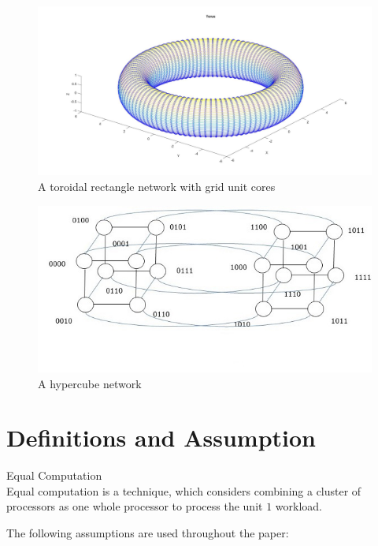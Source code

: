 \begin{figure}[!ht]
\centering
\includegraphics[width=1\columnwidth]{figure/torusnetwork.jpg}
\caption{A toroidal rectangle network with grid unit cores}
\label{fig:torusnetwork}
\end{figure}

\begin{figure}[!ht]
\centering
\includegraphics[width=0.8\columnwidth]{figure/hypercube.jpg}
\caption{A hypercube network}
\label{fig:hypercube}
\end{figure}
\newpage 

\section{Definitions and Assumption}

\theoremstyle{definition}
\begin{definition}{Equal Computation}\\
Equal computation is a technique, which considers combining a cluster of processors as one whole processor to process the unit $1$ workload.
\end{definition}

The following assumptions are used throughout the paper:

